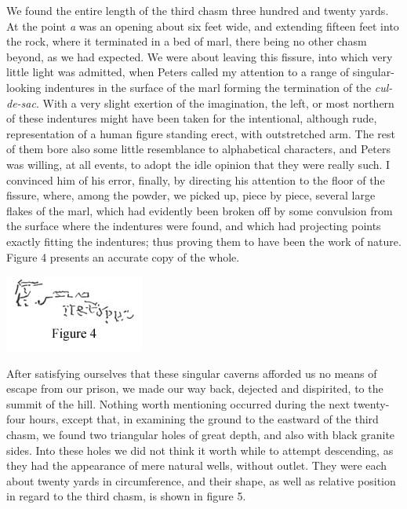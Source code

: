 We found the entire length of the third chasm three hundred and twenty yards.
At the point \emph{a} was an opening about six feet wide, and extending fifteen
feet into the rock, where it terminated in a bed of marl, there being no other
chasm beyond, as we had expected. We were about leaving this fissure, into which
very little light was admitted, when Peters called my attention to a range of
singular-looking indentures in the surface of the marl forming the termination
of the \emph{cul-de-sac}. With a very slight exertion of the imagination, the
left, or most northern of these indentures might have been taken for the
intentional, although rude, representation of a human figure standing erect,
with outstretched arm. The rest of them bore also some little resemblance to
alphabetical characters, and Peters was willing, at all events, to adopt the
idle opinion that they were really such. I convinced him of his error, finally,
by directing his attention to the floor of the fissure, where, among the powder,
we picked up, piece by piece, several large flakes of the marl, which had
evidently been broken off by some convulsion from the surface where the
indentures were found, and which had projecting points exactly fitting the
indentures; thus proving them to have been the work of nature. Figure 4 presents
an accurate copy of the whole. 
\begin{center}
    \includegraphics[scale=0.75]{Pym_4}
\end{center}

After satisfying ourselves that these singular caverns afforded us no means
of escape from our prison, we made our way back, dejected and dispirited, to the
summit of the hill. Nothing worth mentioning occurred during the next
twenty-four hours, except that, in examining the ground to the eastward of the
third chasm, we found two triangular holes of great depth, and also with black
granite sides. Into these holes we did not think it worth while to attempt
descending, as they had the appearance of mere natural wells, without outlet.
They were each about twenty yards in circumference, and their shape, as well as
relative position in regard to the third chasm, is shown in figure 5. 

